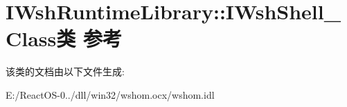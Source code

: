 \hypertarget{class_i_wsh_runtime_library_1_1_i_wsh_shell___class}{}\section{I\+Wsh\+Runtime\+Library\+:\+:I\+Wsh\+Shell\+\_\+\+Class类 参考}
\label{class_i_wsh_runtime_library_1_1_i_wsh_shell___class}


该类的文档由以下文件生成\+:\begin{DoxyCompactItemize}
\item 
E\+:/\+React\+O\+S-\/0../dll/win32/wshom.\+ocx/wshom.\+idl\end{DoxyCompactItemize}
